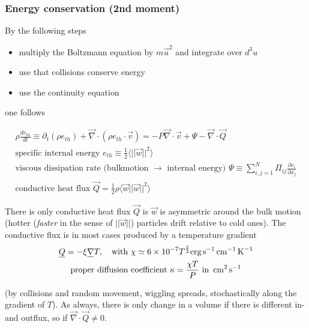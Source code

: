 \subsubsection{Energy conservation (2nd moment)}
By the following steps
\begin{itemize}
    \item multiply the Boltzmann equation by $m\vec{u}^2$ and integrate over $d^3u$
    \item use that collisions conserve energy
    \item use the continuity equation
\end{itemize}
one follows
\begin{mdframed}[style = padded]
    \begin{equation}
        \begin{gathered}
            \rho \frac{de_{th}}{dt} \equiv \partial_t (\rho e_{th}) + \vec{\nabla} \cdot (\rho e_{th}\cdot \vec{v}) = -P \vec{\nabla}\cdot \vec{v} + \Psi - \vec{\nabla} \cdot \vec{Q} \\
            \text{specific internal energy } e_{th} \equiv \frac{1}{2} \langle ||\vec{w}||^2 \rangle \\
            \text{viscous dissipation rate (bulkmotion } \rightarrow \text{ internal energy) } \Psi \equiv \sum_{i,j=1}^{N} \Pi_{ij} \frac{\partial v_i}{\partial x_j} \\
            \text{conductive heat flux } \vec{Q} = \frac{1}{2} \rho \langle \vec{w} ||\vec{w}||^2 \rangle
        \end{gathered}
    \end{equation}
\end{mdframed}
There is only conductive heat flux $\vec{Q}$ is $\vec{w}$ is asymmetric around the bulk motion (hotter (\textit{faster} in the sense of $||\vec{w}||$) particles drift relative to cold ones).
The conductive flux is in most cases produced by a temperature gradient
\begin{equation}
    \begin{gathered}
        \vec{Q} = -\xi \vec{\nabla} T, \quad \text{with } \chi \simeq 6 \times 10^{-7} T^{\frac{5}{2}} \text{erg} \s^{-1} \cm^{-1} \K^{-1} \\
        \text{proper diffusion coefficient } \kappa = \frac{\chi T}{P} \text{ in } \cm^2 \s^{-1}
    \end{gathered}
\end{equation}

(by collisions and random movement, wiggling spreads, stochastically along the gradient of $T$). As always, there is only change in a volume
if there is different in- and outflux, so if $\vec{\nabla} \cdot \vec{Q} \ne 0$.

